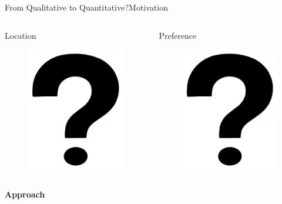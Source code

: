 \begin{frame}{From Qualitative to Quantitative?}{Motivation}

\begin{columns}
\begin{minipage}[t]{.9\textwidth}
\begin{block}{ Location }
\centering
\begin{figure}
	\centering
	\includegraphics[width=.4\linewidth]{figure/question_mark}
\end{figure}
\end{block}
\end{minipage}
\begin{minipage}[t]{.9\textwidth}
\begin{block}{ Preference }
\centering
\begin{figure}
	\centering
	\includegraphics[width=.4\linewidth]{figure/question_mark}
\end{figure}
\end{block}
\end{minipage}	
\end{columns}

\begin{block}{\bf Approach}


\end{block}
\end{frame}
